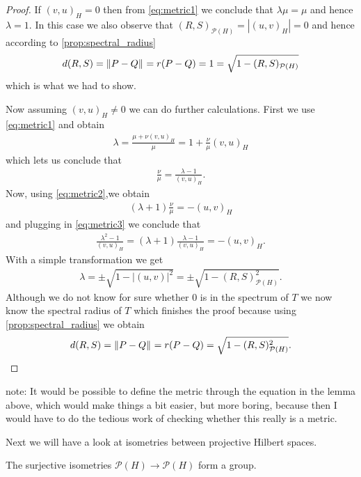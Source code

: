 \begin{proof}
	If $(v,u)_H = 0$ then from \eqref{eq:metric1} we conclude that $\lambda \mu = \mu$ and hence $\lambda = 1$. In this case we also observe that $(R,S)_{\mathcal{P}(H)} = |(u,v)_H| = 0$ and hence according to \ref{prop:spectral_radius}
	\begin{align*}
		d(R,S) = {\left \| P - Q \right \|}_{} = r(P - Q) = 1 = \sqrt{1 - (R,S)_{\mathcal{P}(H)}}
	\end{align*}
	which is what we had to show.
	
	Now assuming $(v,u)_H \neq 0$ we can do further calculations. First we use \eqref{eq:metric1} and obtain
	\begin{align*}
		\lambda = \frac{\mu + \nu (v,u)_H}{\mu} = 1 + \frac{\nu}{\mu} (v,u)_H 
	\end{align*}
	which lets us conclude that 
	\begin{align}
		\frac{\nu}{\mu} = \frac{\lambda - 1}{(v,u)_H}. \label{eq:metric3}
	\end{align}
	Now, using \eqref{eq:metric2},we obtain
	\begin{align*}
		 (\lambda + 1) \frac{\nu}{\mu} =  -(u,v)_H 
	\end{align*}
	and plugging in \eqref{eq:metric3} we conclude that
	\begin{align*}
			\frac{\lambda^2 - 1}{(v,u)_H} = (\lambda + 1) \frac{\lambda - 1}{(v,u)_H} =  - (u,v)_H.
	\end{align*}
	With a simple transformation we get
	\begin{align*}
		\lambda = \pm \sqrt{1 - |(u,v)|^2} = \pm \sqrt{1 - (R,S)_{\mathcal{P}(H)}^2}.
	\end{align*}
	Although we do not know for sure whether $0$ is in the spectrum of $T$ we now know the spectral radius of $T$ which finishes the proof because using \ref{prop:spectral_radius} we obtain
	\begin{align*}
		d(R,S) = {\left \| P - Q \right \|}_{} = r(P - Q) = \sqrt{1 - (R,S)_{\mathcal{P}(H)}^2}.
	\end{align*}
\end{proof}


note: It would be possible to define the metric through the equation in the lemma above, which would make things a bit easier, but more boring, because then I would have to do the tedious work of checking whether this really is a metric.

Next we will have a look at isometries between projective Hilbert spaces.

\begin{lemma}
	The surjective isometries $\mathcal{P}(H) \to \mathcal{P}(H)$ form a group.
\end{lemma}

